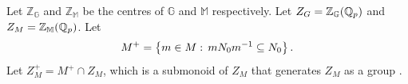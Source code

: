 \documentclass[10pt]{amsart}
\begin{document}
Let $\mathbb{Z}_{\mathbb{G}}$ and $\mathbb{Z}_{\mathbb{M}}$ be the centres of $\mathbb{G}$ and $\mathbb{M}$ respectively. Let $Z_G = \mathbb{Z}_{\mathbb{G}}(\mathbb{Q}_{p})$ and $Z_M = \mathbb{Z}_{\mathbb{M}}(\mathbb{Q}_{p})$. Let \[
    M^{+}=\left\{m\in M:\,mN_{0}m^{-1}\subseteq N_{0}\right\}.
\] Let $Z_{M}^{+} = M^{+}\cap Z_{M}$, which is a submonoid of $Z_{M}$ that generates $Z_{M}$ as a group \cite[Cor. 3.3.3]{Jacquet1}. 

\end{document}
